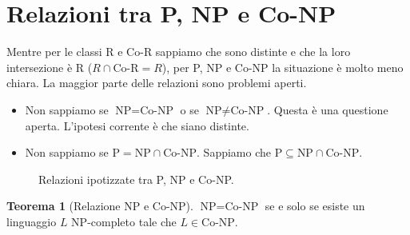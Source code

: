 \documentclass[a4paper]{article}
\theoremstyle{definition} %
\newtheorem{theorem}{Teorema}
\begin{document}
\section{Relazioni tra P, NP e Co-NP}

Mentre per le classi R e Co-R sappiamo che sono distinte e che la loro intersezione è R ($R \cap \text{Co-R} = R$), per P, NP e Co-NP la situazione è molto meno chiara. La maggior parte delle relazioni sono problemi aperti.

\begin{itemize}
    \item Non sappiamo se $\text{NP} = \text{Co-NP}$ o se $\text{NP} \neq \text{Co-NP}$. Questa è una questione aperta. L'ipotesi corrente è che siano distinte.
    \item Non sappiamo se $\text{P} = \text{NP} \cap \text{Co-NP}$. Sappiamo che $\text{P} \subseteq \text{NP} \cap \text{Co-NP}$.
\end{itemize}

\begin{figure}[h]
\centering
{}
\caption{Relazioni ipotizzate tra P, NP e Co-NP.}
\end{figure}

\begin{theorem}[Relazione NP e Co-NP]
$\text{NP} = \text{Co-NP}$ se e solo se esiste un linguaggio $L$ NP-completo tale che $L \in \text{Co-NP}$.
\end{theorem}
\end{document}

